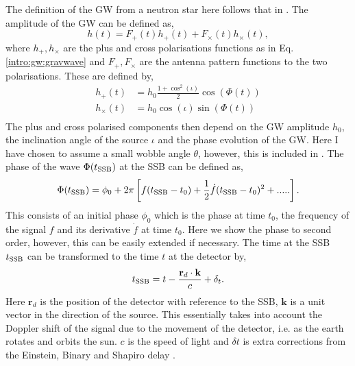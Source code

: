 The definition of the \ac{GW} from a neutron star here follows that in \citep{riles2017RecentSearches,schutz1998DataAnalysis,dupuis2005BayesianEstimation}. The amplitude of the \ac{GW} can be defined as,
\begin{equation}
\label{intro:cw:ht}
h(t) = F_+(t)h_{+}(t) +F_{\times}(t)h_{\times}(t),
\end{equation}
where $h_{+},h_{\times}$ are the plus and cross polarisations functions as in Eq.\ref{intro:gw:gravwave} and $F_{+},F_{\times}$ are the antenna pattern functions to the two polarisations.
These are defined by,
\begin{equation}
\label{intro:cw:amplitudes}
    \begin{split}
        h_{+}(t) &=  h_0 \frac{1 + \cos^2{(\iota)}}{2}\cos{\left(\Phi(t)\right)} \\
        h_{\times}(t) &= h_0  \cos{(\iota)} \sin{\left( \Phi(t)\right) } \\
    \end{split}
\end{equation}
The plus and cross polarised components then depend on the \ac{GW} amplitude $h_0$, the inclination angle of the source $\iota$ and the phase evolution of the \ac{GW}. Here I have chosen to assume a small wobble angle $\theta$, however, this is included in \citep{schutz1998DataAnalysis}. The phase of the wave $\Phi(t_{{\rm SSB}})$ at the \ac{SSB} can be defined as,
\begin{equation}
\label{searchcw:model:phase}
    \Phi(t_{{\rm SSB}}) = \phi_0 + 2\pi\left[ f(t_{{\rm SSB}} - t_0) + \frac{1}{2} \dot{f} (t_{{\rm SSB}} - t_0)^2 + .....\right] .
\end{equation}
This consists of an initial phase $\phi_0$ which is the phase at time $t_0$, the frequency of the signal $f$ and its derivative ${\dot{f}}$ at time $t_0$. Here we show the phase to second order, however, this can be easily extended if necessary. 
The time at the \ac{SSB} $t_{{\rm SSB}}$ can be transformed to the time $t$ at the detector by,
\begin{equation}
t_{{\rm SSB}} = t - \frac{\mathbf{r}_d \cdot \mathbf{k}}{c} + \delta_t.
\end{equation}
Here $\mathbf{r}_d$ is the position of the detector with reference to the \ac{SSB}, $\mathbf{k}$ is a unit vector in the direction of the source. This essentially takes into account the Doppler shift of the signal due to the movement of the detector, i.e. as the earth rotates and orbits the sun. $c$ is the speed of light and $\delta t$ is extra corrections from the Einstein, Binary and Shapiro delay \citep{}.
